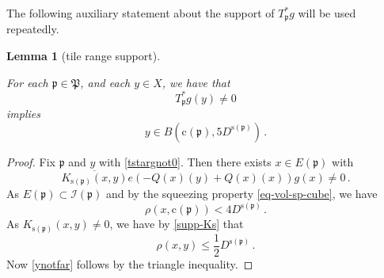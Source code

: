 \documentclass[10pt,a4paper]{article}
\theoremstyle{plain}
\newtheorem{lemma}[theorem]{Lemma}
\theoremstyle{definition}
\numberwithin{equation}{subsection}
\newcommand{\fp}{{\mathfrak p}}
\newcommand{\fP}{{\mathfrak P}}
\newcommand{\pc}{{\mathrm{c}}}
\newcommand{\ps}{{\mathrm{s}}}
\newcommand{\scI}{{\mathcal{I}}} %
\newcommand{\tQ}{{Q}}
\newcommand{\lean}[1]{}
\newcommand{\leanok}{}
\begin{document}
The following auxiliary statement about the support of $T_\fp^*g$ will be
used repeatedly.

\begin{lemma}[tile range support]\label{tile-range-support}
    \leanok
    \lean{Tile.range_support}
        For each $\fp\in \fP$, and each $y\in X$, we have that
    \begin{equation}\label{tstargnot0}
         T_{\fp}^* g(y)\neq 0
    \end{equation}
       implies
    \begin{equation}\label{ynotfar}
        y\in B(\pc(\fp),5D^{\ps(\fp)})\, .
    \end{equation}
    \end{lemma}
    \begin{proof}
    \leanok
    Fix $\fp$ and $y$ with \eqref{tstargnot0}.
    Then there exists $x\in E(\fp)$ with
    \begin{equation}
       \overline{K_{\ps(\fp)}(x,y)}e(-\tQ(x)(y)
        +\tQ(x)(x))g(x) \neq 0\, .
    \end{equation}
    As $E(\fp)\subset \scI(\fp)$ and by the squeezing property
    \eqref{eq-vol-sp-cube}, we have
    \begin{equation}
        \rho(x,\pc(\fp)) < 4D^{\ps(\fp)}\, .
    \end{equation}
    As $K_{\ps(\fp)}(x,y)\neq 0$, we have by \eqref{supp-Ks}
    that
    \begin{equation}
    \rho(x,y)\le \frac 12 D^{\ps(\fp)}\, .
    \end{equation}
    Now \eqref{ynotfar} follows by the triangle inequality.
\end{proof}
\end{document}
